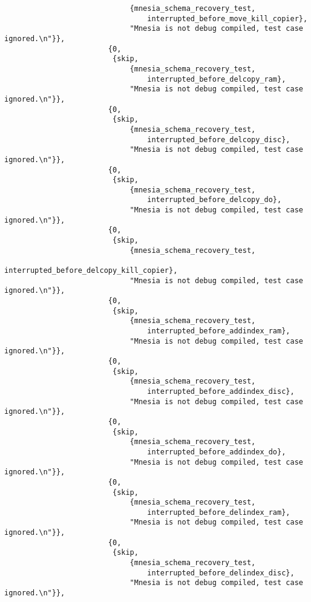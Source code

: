 \begin{verbatim}
                             {mnesia_schema_recovery_test,
                                 interrupted_before_move_kill_copier},
                             "Mnesia is not debug compiled, test case ignored.\n"}},
                        {0,
                         {skip,
                             {mnesia_schema_recovery_test,
                                 interrupted_before_delcopy_ram},
                             "Mnesia is not debug compiled, test case ignored.\n"}},
                        {0,
                         {skip,
                             {mnesia_schema_recovery_test,
                                 interrupted_before_delcopy_disc},
                             "Mnesia is not debug compiled, test case ignored.\n"}},
                        {0,
                         {skip,
                             {mnesia_schema_recovery_test,
                                 interrupted_before_delcopy_do},
                             "Mnesia is not debug compiled, test case ignored.\n"}},
                        {0,
                         {skip,
                             {mnesia_schema_recovery_test,
                                 interrupted_before_delcopy_kill_copier},
                             "Mnesia is not debug compiled, test case ignored.\n"}},
                        {0,
                         {skip,
                             {mnesia_schema_recovery_test,
                                 interrupted_before_addindex_ram},
                             "Mnesia is not debug compiled, test case ignored.\n"}},
                        {0,
                         {skip,
                             {mnesia_schema_recovery_test,
                                 interrupted_before_addindex_disc},
                             "Mnesia is not debug compiled, test case ignored.\n"}},
                        {0,
                         {skip,
                             {mnesia_schema_recovery_test,
                                 interrupted_before_addindex_do},
                             "Mnesia is not debug compiled, test case ignored.\n"}},
                        {0,
                         {skip,
                             {mnesia_schema_recovery_test,
                                 interrupted_before_delindex_ram},
                             "Mnesia is not debug compiled, test case ignored.\n"}},
                        {0,
                         {skip,
                             {mnesia_schema_recovery_test,
                                 interrupted_before_delindex_disc},
                             "Mnesia is not debug compiled, test case ignored.\n"}},

\end{verbatim}
